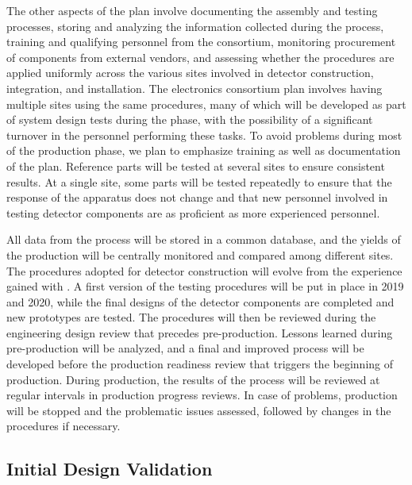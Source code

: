 The other aspects of the  plan involve documenting the 
assembly and testing processes, storing and analyzing the information
collected during the  process, training and qualifying 
personnel from the consortium, monitoring procurement of 
components from external vendors, and assessing whether the
 procedures are applied uniformly across
the various sites involved in detector construction, integration,
and installation. The  electronics consortium plan involves
having multiple sites using the same  procedures,
many of which will be developed as part of system design tests during the  phase,
with the possibility of a significant turnover in the personnel
performing these tasks. To avoid problems during most of the
production phase, we plan to emphasize training as well as documentation
of the  plan. Reference parts will be tested at
several sites to ensure consistent results. At
a single site, some parts will be tested repeatedly to ensure
that the response of the apparatus does not change and
that new personnel involved in testing detector components are 
as proficient as more experienced personnel. 

All data from
the  process will be stored in a common database, and
the yields of the production will be centrally monitored and 
compared among different sites. The procedures adopted
for detector construction will evolve from the experience
gained with . A first version of the testing procedures
will be put in place in 2019 and 2020, while the final designs of
the detector components are completed and new prototypes are
tested. The  procedures will then be reviewed
during the engineering design review that precedes pre-production. Lessons learned during pre-production
will be analyzed, and a final and improved  process will be 
developed before the production readiness review that triggers
the beginning of production. During production, the results
of the  process will be reviewed at regular intervals
in production progress reviews. In case of problems, production
will be stopped and the problematic issues assessed, 
followed by changes in the procedures if necessary.

\subsection{Initial Design Validation}
\label{sec:fdsp-tpcelec-qa-initial}

